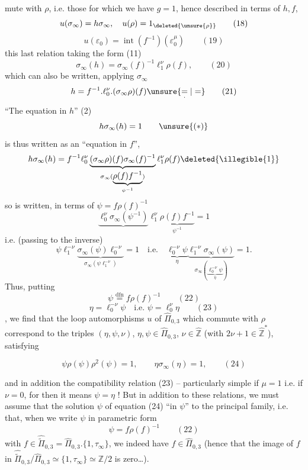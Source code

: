 mute with $\rho$, i.e. those for which we have $g=1$, hence described in terms of $h,f$,
\[
u(\sigma_\infty)=h\sigma_\infty,\quad u(\rho)=1_{\deleted{\unsure{\rho}}}\qquad (18)
\]
\[
u(\varepsilon_0)=\operatorname{int}(f^{-1})(\varepsilon_0^\mu)
\qquad (19)
\]
this last relation taking the form (11)
\[
\sigma_\infty(h)=\sigma_\infty(f)^{-1}\ell_1^\nu\rho(f),
\qquad (20)
\]
which can also be written, applying $\sigma_\infty$
\[
h=f^{-1}.\ell_0^\nu.(\sigma_\infty\rho)(f)\unsure{\underset{\cdot}{=}|=}
\qquad (21)
\]
``The equation in $h$'' (2) 
\[
h\sigma_\infty(h)=1
\qquad \unsure{(*)}
\]
is thus written as an ``equation in $f$'',  
\[
h\sigma_\infty(h)=f^{-1}\ell_0^\nu
\underbrace{(\sigma_\infty\rho)(f)\sigma_\infty(f)^{-1}}_{\sigma_\infty(\underbrace{\rho(f)f^{-1}}_{\psi^{-1}})}
\ell_1^\nu\rho(f)\deleted{\illegible{1}}
\]
so  is written, in terms of $\psi=f\rho(f)^{-1}$
\[
\underbrace{\ell_0^\nu\sigma_\infty(\psi^{-1})}\ell_1^\nu
\underbrace{\rho(f)f^{-1}}_{\psi^{-1}}=1
\]
i.e. (passing to the inverse)
\[
\psi\ell_1^{-\nu}\underbrace{\sigma_\infty(\psi)\ell_0^{-\nu}}_{\sigma_\infty(\psi\ell_1^{-\nu})}=1
\quad\text{i.e.}\quad
\underbrace{\ell_0^{-\nu}\psi}_{\eta}
\underbrace{\ell_1^{-\nu}\sigma_\infty(\psi)}_{\sigma_\infty(\underbrace{\ell_0^{-\nu}\psi}_{\eta})}=1.
\]
Thus, putting
\[
\psi\overset{\mathrm{dfn}}{=}f\rho(f)^{-1}
\qquad (22)
\]
\[
\boxed{\eta=\ell_0^{-\nu}\psi\quad\text{i.e. }\psi=\ell_0^\nu\eta}
\qquad (23)
\]
, we find that the loop automorphisms $u$ of $\widehat{\Pi}_{0,3}$ which commute with $\rho$ correspond to the triples $(\eta,\psi,\nu)$, $\eta,\psi\in\widehat{\Pi}_{0,3}$, $\nu\in\widehat{\mathbb Z}$ (with $2\nu+1\in\widehat{\mathbb Z}^{*}$), satisfying



\[
\boxed{\psi\rho(\psi)\rho^2(\psi)=1,\qquad\eta\sigma_\infty(\eta)=1},
\qquad (24)
\]

and in addition the compatibility relation (23) -- particularly simple if $\mu=1$ i.e. if $\nu=0$, for then it means $\psi=\eta$ ! But in addition to these relations, we must assume that the solution $\psi$ of equation (24) ``in $\psi$''  to the principal family, i.e. that, when we write $\psi$ in parametric form
\[
\psi=f\rho(f)^{-1}
\qquad (22)
\]
with $f\in\widehat{\widetilde{\Pi}}_{0,3}=\widehat{\Pi}_{0,3}.\{1,\tau_\infty\}$, we indeed have $f\in\widehat{\Pi}_{0,3}$ (hence that the image of $f$ in $\widehat{\widetilde{\Pi}}_{0,3}/\widehat{\Pi}_{0,3}\simeq\{1,\tau_\infty\}\simeq\mathbb Z/2$ is zero\dots).

